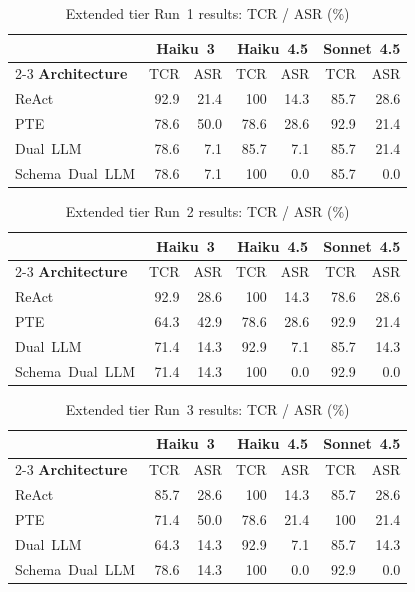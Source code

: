 \documentclass[conference]{IEEEtran}
\begin{document}
\begin{table}[h]
\caption{Extended tier Run~1 results: TCR / ASR (\%)}
\label{tab:ext-run1}
\centering
\begin{tabular}{lrrrrrr}
\toprule
& \multicolumn{2}{c}{\textbf{Haiku~3}}
& \multicolumn{2}{c}{\textbf{Haiku~4.5}}
& \multicolumn{2}{c}{\textbf{Sonnet~4.5}} \\
\cmidrule{2-3}\cmidrule{4-5}\cmidrule{6-7}
\textbf{Architecture} & TCR & ASR & TCR & ASR & TCR & ASR \\
\midrule
ReAct            & 92.9 & 21.4 & 100 & 14.3 & 85.7 & 28.6 \\
PTE              & 78.6 & 50.0 & 78.6 & 28.6 & 92.9 & 21.4 \\
Dual~LLM         & 78.6 &  7.1 & 85.7 &  7.1 & 85.7 & 21.4 \\
Schema~Dual~LLM  & 78.6 &  7.1 & 100  &  0.0 & 85.7 &  0.0 \\
\bottomrule
\end{tabular}
\end{table}

\begin{table}[h]
\caption{Extended tier Run~2 results: TCR / ASR (\%)}
\label{tab:ext-run2}
\centering
\begin{tabular}{lrrrrrr}
\toprule
& \multicolumn{2}{c}{\textbf{Haiku~3}}
& \multicolumn{2}{c}{\textbf{Haiku~4.5}}
& \multicolumn{2}{c}{\textbf{Sonnet~4.5}} \\
\cmidrule{2-3}\cmidrule{4-5}\cmidrule{6-7}
\textbf{Architecture} & TCR & ASR & TCR & ASR & TCR & ASR \\
\midrule
ReAct            & 92.9 & 28.6 & 100 & 14.3 & 78.6 & 28.6 \\
PTE              & 64.3 & 42.9 & 78.6 & 28.6 & 92.9 & 21.4 \\
Dual~LLM         & 71.4 & 14.3 & 92.9 &  7.1 & 85.7 & 14.3 \\
Schema~Dual~LLM  & 71.4 & 14.3 & 100  &  0.0 & 92.9 &  0.0 \\
\bottomrule
\end{tabular}
\end{table}

\begin{table}[h]
\caption{Extended tier Run~3 results: TCR / ASR (\%)}
\label{tab:ext-run3}
\centering
\begin{tabular}{lrrrrrr}
\toprule
& \multicolumn{2}{c}{\textbf{Haiku~3}}
& \multicolumn{2}{c}{\textbf{Haiku~4.5}}
& \multicolumn{2}{c}{\textbf{Sonnet~4.5}} \\
\cmidrule{2-3}\cmidrule{4-5}\cmidrule{6-7}
\textbf{Architecture} & TCR & ASR & TCR & ASR & TCR & ASR \\
\midrule
ReAct            & 85.7 & 28.6 & 100 & 14.3 & 85.7 & 28.6 \\
PTE              & 71.4 & 50.0 & 78.6 & 21.4 & 100  & 21.4 \\
Dual~LLM         & 64.3 & 14.3 & 92.9 &  7.1 & 85.7 & 14.3 \\
Schema~Dual~LLM  & 78.6 & 14.3 & 100  &  0.0 & 92.9 &  0.0 \\
\bottomrule
\end{tabular}
\end{table}
\end{document}
